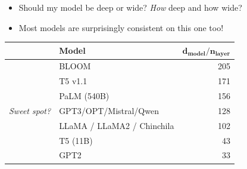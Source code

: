 \begin{itemize}
  \item Should my model be deep or wide? \emph{How} deep and how wide?
  \item Most models are surprisingly consistent on this one too!
\end{itemize}
\begin{center}
\small
\renewcommand{\arraystretch}{0.95}
\begin{tabular}{@{}llr@{}}
\toprule
 & \textbf{Model} & $\boldsymbol{d_{model}/n_{layer}}$\\
\midrule
 & BLOOM & 205\\
 & T5 v1.1 & 171\\
\rowcolor{blue!8} & PaLM (540B) & 156\\
\rowcolor{blue!8} \emph{Sweet spot?} & GPT3/OPT/Mistral/Qwen & 128\\
\rowcolor{blue!8} & LLaMA / LLaMA2 / Chinchila & 102\\
 & T5 (11B) & 43\\
 & GPT2 & 33\\
\bottomrule
\end{tabular}
\end{center}
